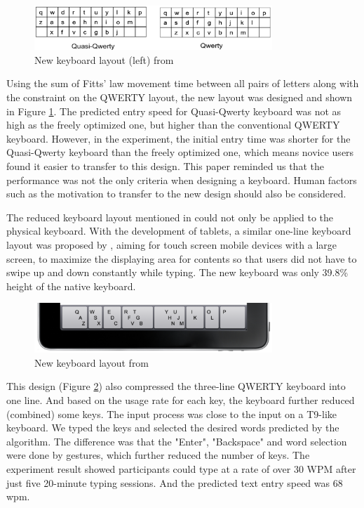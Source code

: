 \documentclass[11pt]{article}
\begin{document}
\begin{figure}[H]
  \centering
  \includegraphics[width=0.8\textwidth]{Layout2010.png}
  \caption{New keyboard layout (left) from \citep{10.1145/1753326.1753367}}
  \label{fig:layout2010}
\end{figure}

Using the sum of Fitts’ law movement time between all pairs of letters along with the constraint on the QWERTY layout, the new layout was designed and shown in Figure \ref{fig:layout2010}. The predicted entry speed for Quasi-Qwerty keyboard was not as high as the freely optimized one, but higher than the conventional QWERTY keyboard. However, in the experiment, the initial entry time was shorter for the Quasi-Qwerty keyboard than the freely optimized one, which means novice users found it easier to transfer to this design. This paper reminded us that the performance was not the only criteria when designing a keyboard. Human factors such as the motivation to transfer to the new design should also be considered.

The reduced keyboard layout mentioned in \citet{10.1145/985921.986082} could not only be applied to the physical keyboard. With the development of tablets, a similar one-line keyboard layout was proposed by \citet{10.1145/2047196.2047257}, aiming for touch screen mobile devices with a large screen, to maximize the displaying area for contents so that users did not have to swipe up and down constantly while typing. The new keyboard was only 39.8\% height of the native keyboard.

\begin{figure}[H]
  \centering
  \includegraphics[width=0.8\textwidth]{Layout2011.png}
  \caption{New keyboard layout from \citep{10.1145/2047196.2047257}}
  \label{fig:layout2011}
\end{figure}

This design (Figure \ref{fig:layout2011}) also compressed the three-line QWERTY keyboard into one line. And based on the usage rate for each key, the keyboard further reduced (combined) some keys. The input process was close to the input on a T9-like keyboard. We typed the keys and selected the desired words predicted by the algorithm. The difference was that the "Enter", "Backspace" and word selection were done by gestures, which further reduced the number of keys. The experiment result showed participants could type at a rate of over 30 WPM after just five 20-minute typing sessions. And the predicted text entry speed was 68 wpm.
\end{document}
